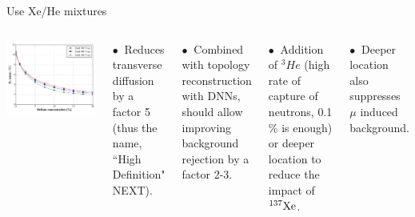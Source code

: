 \documentclass [aspectratio=169]{beamer}
\newcommand{\XES}{\ensuremath{{}^{137}{\rm Xe}}}
\begin{document}
\begin{frame}{Use Xe/He mixtures}
\begin{columns}
\includegraphics[scale=0.15]{xeHe.png}


$\bullet~$ Reduces transverse diffusion by a factor 5 (thus the name, ``High Definition" NEXT).

$\bullet~$ Combined with topology reconstruction with DNNs, should allow improving background rejection by a factor 2-3. 

$\bullet~$ Addition of ${}^{3}He$ (high rate of capture of neutrons, 0.1 \% is enough) or deeper location to reduce the impact of \XES. 

$\bullet~$ Deeper location also suppresses $\mu$ induced background. 

\end{columns}
\end{frame}
\end{document}
